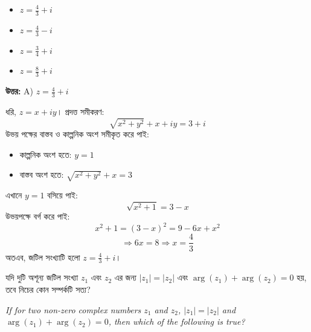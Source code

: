 \documentclass[12pt, a4paper]{article}
\begin{document}
\begin{itemize}[label={}, leftmargin=1cm, itemsep=0.5em]
    \item[\textbf{A)}] $z = \frac{4}{3} + i$
    \item[\textbf{B)}] $z = \frac{4}{3} - i$
    \item[\textbf{C)}] $z = \frac{3}{4} + i$
    \item[\textbf{D)}] $z = \frac{8}{3} + i$
\end{itemize}

\vspace{0.5em}
\begin{tcolorbox}[answerbox]
    \textbf{\color{success} উত্তর:} A) $z = \frac{4}{3} + i$
\end{tcolorbox}
\vspace{1em}

\begin{tcolorbox}[solutionbox={সমাধান (Solution)}]
    \noindent
    ধরি, $z = x + iy$। প্রদত্ত সমীকরণ:
    \[ \sqrt{x^2+y^2} + x + iy = 3 + i \]
    উভয় পক্ষের বাস্তব ও কাল্পনিক অংশ সমীকৃত করে পাই:
    \begin{itemize}[itemsep=0.3em]
        \item কাল্পনিক অংশ হতে: $y = 1$
        \item বাস্তব অংশ হতে: $\sqrt{x^2+y^2} + x = 3$
    \end{itemize}
    এখানে $y = 1$ বসিয়ে পাই:
    \[ \sqrt{x^2+1} = 3 - x \]
    উভয়পক্ষে বর্গ করে পাই:
    \[ x^2 + 1 = (3-x)^2 = 9 - 6x + x^2 \]
    \[ \Rightarrow 6x = 8 \Rightarrow x = \frac{4}{3} \]
    অতএব, জটিল সংখ্যাটি হলো $z = \frac{4}{3} + i$।
\end{tcolorbox}

\vspace{1.5em}

\begin{tcolorbox}[questionbox={প্রশ্ন (Question) 21}]
    \noindent
    যদি দুটি অশূন্য জটিল সংখ্যা $z_1$ এবং $z_2$ এর জন্য $|z_1| = |z_2|$ এবং $\arg(z_1) + \arg(z_2) = 0$ হয়, তবে নিচের কোন সম্পর্কটি সত্য?
    
    \vspace{0.8em}
    \begin{english}
    \noindent\textit{\color{darkgray}
    If for two non-zero complex numbers $z_1$ and $z_2$, $|z_1| = |z_2|$ and $\arg(z_1) + \arg(z_2) = 0$, then which of the following is true?
    }
    \end{english}
\end{tcolorbox}
\end{document}
